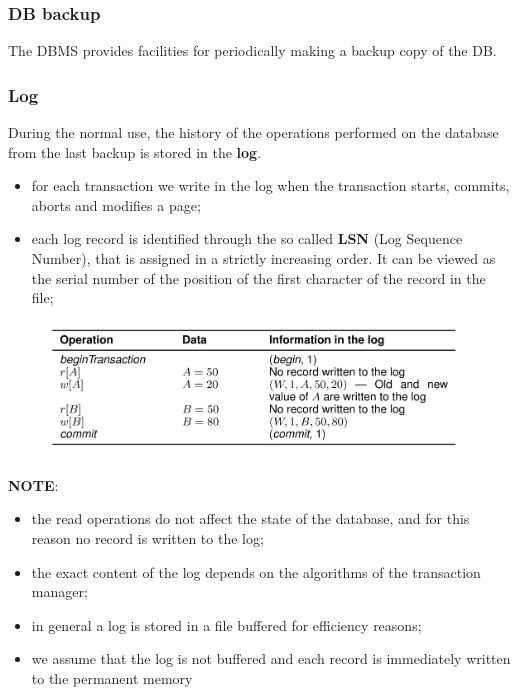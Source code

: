 \subsubsection{DB backup}
The DBMS provides facilities for periodically making a backup copy of the DB.

\subsubsection{Log}
During the normal use, the history of the operations performed on the database from the last backup is stored in the \textbf{log}. 

\begin{itemize}
    \item for each transaction we write in the log when the transaction starts, commits, aborts and modifies a page;
    \item each log record is identified through the so called \textbf{LSN} (Log Sequence Number), that is assigned in a strictly increasing order. It can be viewed as the serial number of the position of the first character of the record in the file;
\end{itemize}

\begin{figure}[h!]
		\centering
		\includegraphics[scale = 0.6]{img/tr5.jpg}
		\label{tr2}
\end{figure}

\textbf{NOTE}:

\begin{itemize}

    \item the read operations do not affect the state of the database, and for this reason no record is written to the log;
    
    \item the exact content of the log depends on the algorithms of the transaction manager;
    
    \item in general a log is stored in a file buffered for efficiency reasons;
    
    \item we assume that the log is not buffered and each record is immediately written to the permanent memory
\end{itemize}

